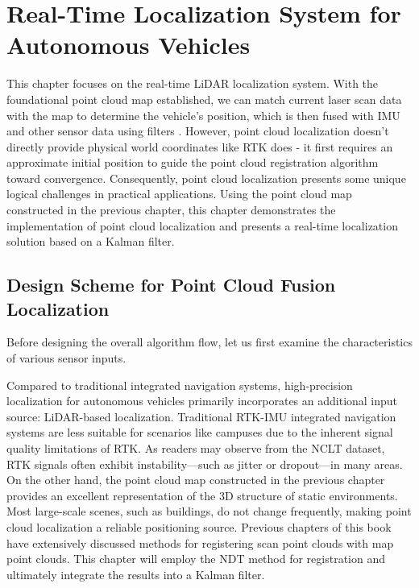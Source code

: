 \thispagestyle{empty}

\chapter{Real-Time Localization System for Autonomous Vehicles}
\thispagestyle{empty}
\label{cpt:localization}

This chapter focuses on the real-time LiDAR localization system. With the foundational point cloud map established, we can match current laser scan data with the map to determine the vehicle's position, which is then fused with IMU and other sensor data using filters \cite{Wang2017}. However, point cloud localization doesn't directly provide physical world coordinates like RTK does - it first requires an approximate initial position to guide the point cloud registration algorithm toward convergence. Consequently, point cloud localization presents some unique logical challenges in practical applications. Using the point cloud map constructed in the previous chapter, this chapter demonstrates the implementation of point cloud localization and presents a real-time localization solution based on a Kalman filter.



\section{Design Scheme for Point Cloud Fusion Localization}  
Before designing the overall algorithm flow, let us first examine the characteristics of various sensor inputs.

Compared to traditional integrated navigation systems, high-precision localization for autonomous vehicles primarily incorporates an additional input source: LiDAR-based localization. Traditional RTK-IMU integrated navigation systems are less suitable for scenarios like campuses due to the inherent signal quality limitations of RTK. As readers may observe from the NCLT dataset, RTK signals often exhibit instability—such as jitter or dropout—in many areas. On the other hand, the point cloud map constructed in the previous chapter provides an excellent representation of the 3D structure of static environments. Most large-scale scenes, such as buildings, do not change frequently, making point cloud localization a reliable positioning source. Previous chapters of this book have extensively discussed methods for registering scan point clouds with map point clouds. This chapter will employ the NDT method for registration and ultimately integrate the results into a Kalman filter.

